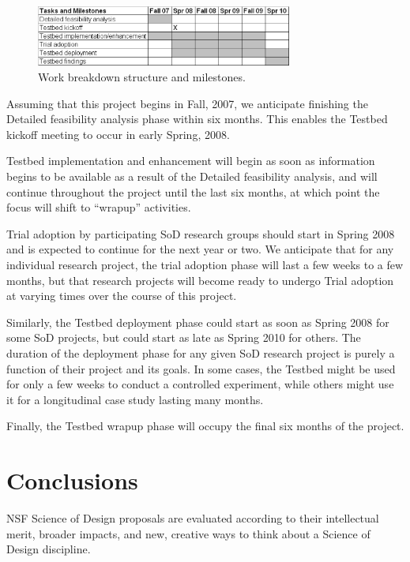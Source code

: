 \begin{figure}[ht]
  \centering
  \includegraphics[width=0.75\textwidth]{workstructure.eps}
  \caption{Work breakdown structure and milestones.} 
  \label{fig:wbs}
\end{figure}

Assuming that this project begins in Fall, 2007, we anticipate finishing the Detailed feasibility
analysis phase within six months.  This enables the Testbed kickoff meeting to occur in early 
Spring, 2008.  

Testbed implementation and enhancement will begin as soon as information begins to be available
as a result of the Detailed feasibility analysis, and will continue throughout the project until 
the last six months, at which point the focus will shift to ``wrapup'' activities. 

Trial adoption by participating SoD research groups should start in Spring 2008 and is expected
to continue for the next year or two.  We anticipate that for any individual research project,
the trial adoption phase will last a few weeks to a few months, but that research projects will
become ready to undergo Trial adoption at varying times over the course of this project.

Similarly, the Testbed deployment phase could start as soon as Spring 2008 for some SoD
projects, but could start as late as Spring 2010 for others.  The duration of the deployment 
phase for any given SoD research project is purely a function of their project and its goals. 
In some cases, the Testbed might be used for only a few weeks to conduct a controlled experiment, 
while others might use it for a longitudinal case study lasting many months. 

Finally, the Testbed wrapup phase will occupy the final six months of the project. 

\section{Conclusions}
\label{sec:merit}

NSF Science of Design proposals are evaluated according to their
intellectual merit, broader impacts, and new, creative ways to think about
a Science of Design discipline.


